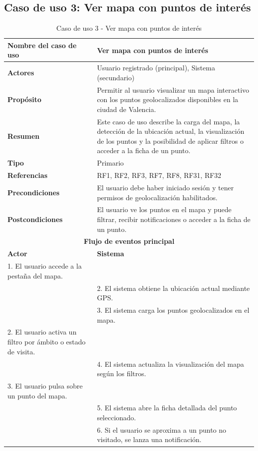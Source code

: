 \subsection{Caso de uso 3: Ver mapa con puntos de interés}

\begin{table}[H]
\centering
\caption{Caso de uso 3 - Ver mapa con puntos de interés}
\begin{tabular}{|p{4.5cm}|p{10.5cm}|}
\hline
\textbf{Nombre del caso de uso} & Ver mapa con puntos de interés \\
\hline
\textbf{Actores} & Usuario registrado (principal), Sistema (secundario) \\
\hline
\textbf{Propósito} & Permitir al usuario visualizar un mapa interactivo con los puntos geolocalizados disponibles en la ciudad de Valencia. \\
\hline
\textbf{Resumen} & Este caso de uso describe la carga del mapa, la detección de la ubicación actual, la visualización de los puntos y la posibilidad de aplicar filtros o acceder a la ficha de un punto. \\
\hline
\textbf{Tipo} & Primario \\
\hline
\textbf{Referencias} & RF1, RF2, RF3, RF7, RF8, RF31, RF32 \\
\hline
\textbf{Precondiciones} & El usuario debe haber iniciado sesión y tener permisos de geolocalización habilitados. \\
\hline
\textbf{Postcondiciones} & El usuario ve los puntos en el mapa y puede filtrar, recibir notificaciones o acceder a la ficha de un punto. \\
\hline
\multicolumn{2}{|c|}{\textbf{Flujo de eventos principal}} \\
\hline
\textbf{Actor} & \textbf{Sistema} \\
\hline
1. El usuario accede a la pestaña del mapa. & \\
\hline
& 2. El sistema obtiene la ubicación actual mediante GPS. \\
\hline
& 3. El sistema carga los puntos geolocalizados en el mapa. \\
\hline
2. El usuario activa un filtro por ámbito o estado de visita. & \\
\hline
& 4. El sistema actualiza la visualización del mapa según los filtros. \\
\hline
3. El usuario pulsa sobre un punto del mapa. & \\
\hline
& 5. El sistema abre la ficha detallada del punto seleccionado. \\
\hline
& 6. Si el usuario se aproxima a un punto no visitado, se lanza una notificación. \\
\hline
\end{tabular}
\end{table}

